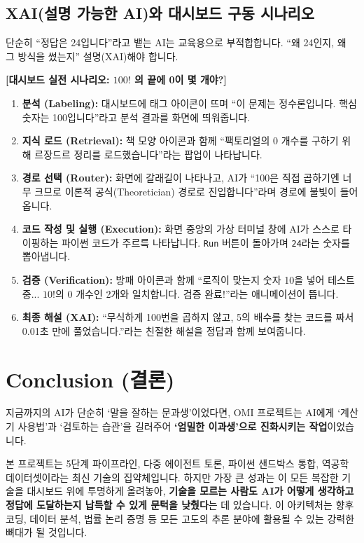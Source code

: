 \documentclass[11pt,a4paper]{article}
\begin{document}
\subsection{XAI(설명 가능한 AI)와 대시보드 구동 시나리오}
단순히 ``정답은 24입니다''라고 뱉는 AI는 교육용으로 부적합합니다. ``왜 24인지, 왜 그 방식을 썼는지'' 설명(XAI)해야 합니다.

\vspace{0.5cm}
\noindent\textbf{[대시보드 실전 시나리오: $100!$ 의 끝에 0이 몇 개야?]}
\begin{enumerate}
    \item \textbf{분석 (Labeling):} 대시보드에 태그 아이콘이 뜨며 ``이 문제는 정수론입니다. 핵심 숫자는 100입니다''라고 분석 결과를 화면에 띄워줍니다.
    \item \textbf{지식 로드 (Retrieval):} 책 모양 아이콘과 함께 ``팩토리얼의 0 개수를 구하기 위해 르장드르 정리를 로드했습니다''라는 팝업이 나타납니다.
    \item \textbf{경로 선택 (Router):} 화면에 갈래길이 나타나고, AI가 ``100은 직접 곱하기엔 너무 크므로 이론적 공식(Theoretician) 경로로 진입합니다''라며 경로에 불빛이 들어옵니다.
    \item \textbf{코드 작성 및 실행 (Execution):} 화면 중앙의 가상 터미널 창에 AI가 스스로 타이핑하는 파이썬 코드가 주르륵 나타납니다. \texttt{Run} 버튼이 돌아가며 \texttt{24}라는 숫자를 뽑아냅니다.
    \item \textbf{검증 (Verification):} 방패 아이콘과 함께 ``로직이 맞는지 숫자 10을 넣어 테스트 중... $10!$의 0 개수인 2개와 일치합니다. 검증 완료!''라는 애니메이션이 뜹니다.
    \item \textbf{최종 해설 (XAI):} ``무식하게 100번을 곱하지 않고, 5의 배수를 찾는 코드를 짜서 0.01초 만에 풀었습니다.''라는 친절한 해설을 정답과 함께 보여줍니다.
\end{enumerate}

\section{Conclusion (결론)}
지금까지의 AI가 단순히 `말을 잘하는 문과생'이었다면, OMI 프로젝트는 AI에게 `계산기 사용법'과 `검토하는 습관'을 길러주어 \textbf{`엄밀한 이과생'으로 진화시키는 작업}이었습니다. 

본 프로젝트는 5단계 파이프라인, 다중 에이전트 토론, 파이썬 샌드박스 통합, 역공학 데이터셋이라는 최신 기술의 집약체입니다. 하지만 가장 큰 성과는 이 모든 복잡한 기술을 대시보드 위에 투명하게 올려놓아, \textbf{기술을 모르는 사람도 AI가 어떻게 생각하고 정답에 도달하는지 납득할 수 있게 문턱을 낮췄다}는 데 있습니다. 이 아키텍처는 향후 코딩, 데이터 분석, 법률 논리 증명 등 모든 고도의 추론 분야에 활용될 수 있는 강력한 뼈대가 될 것입니다.
\end{document}
